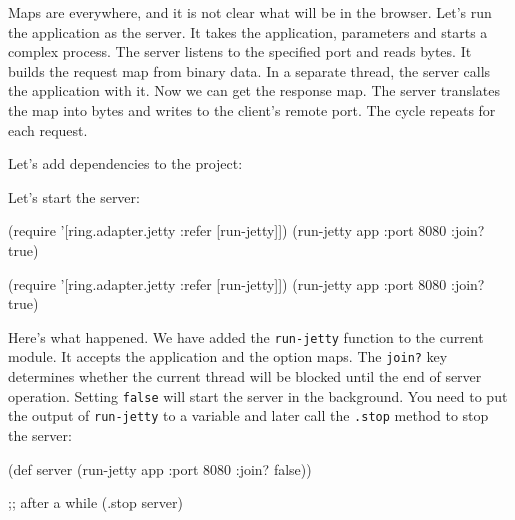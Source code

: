 \fi


Maps are everywhere, and it is not clear what will be in the browser. Let's run the application as the server. It takes the application, parameters and starts a complex process. The server listens to the specified port and reads bytes. It builds the request map from binary data. In a separate thread, the server calls the application with it. Now we can get the response map. The server translates the map into bytes and writes to the client's remote port. The cycle repeats for each request.


Let's add dependencies to the project:

\begin{english}
\begin{clojure}
\end{clojure}
\end{english}

Let's start the server:

\ifx\devicetype\mobile

\begin{english}
\begin{clojure}
(require '[ring.adapter.jetty
:refer [run-jetty]])
(run-jetty app {:port 8080 :join? true})
\end{clojure}
\end{english}

\else

\begin{english}
\begin{clojure}
(require '[ring.adapter.jetty :refer [run-jetty]])
(run-jetty app {:port 8080 :join? true})
\end{clojure}
\end{english}

\fi

Here's what happened. We have added the \verb|run-jetty| function to the current module. It accepts the application and the option maps. The \verb|join?| key determines whether the current thread will be blocked until the end of server operation. Setting \verb|false| will start the server in the background. You need to put the output of \verb|run-jetty| to a variable and later call the \verb|.stop| method to stop the server:

\ifx\devicetype\mobile

\begin{english}
\begin{clojure}
(def server
(run-jetty app {:port 8080
:join? false}))

;; after a while
(.stop server)
\end{clojure}
\end{english}

